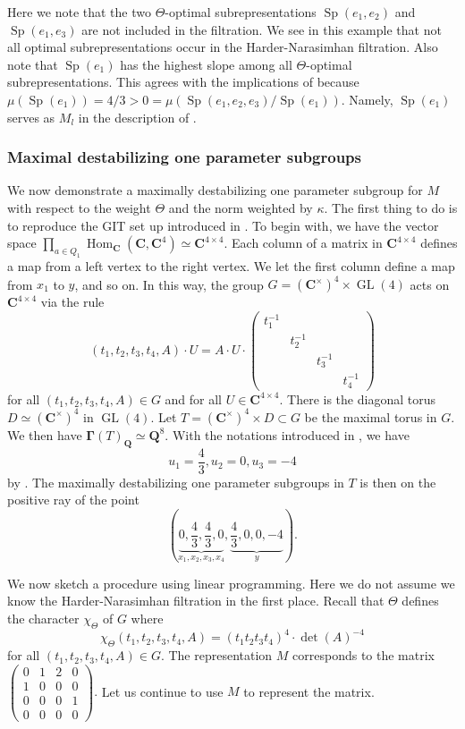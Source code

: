 \documentclass[a4paper]{amsart}
\numberwithin{equation}{section}
\theoremstyle{plain}
\theoremstyle{definition}
\DeclareMathOperator{\Hom}{Hom}
\DeclareMathOperator{\GL}{GL}
\DeclareMathOperator{\Sp}{Sp}
\begin{document}
Here we note that the two $\Theta$-optimal subrepresentations $\Sp(e_1,e_2)$ and $\Sp(e_1,e_3)$ are not included in the filtration.  We see in this example that not all optimal subrepresentations occur in the Harder-Narasimhan filtration. Also note that $\Sp(e_1)$ has the highest slope among all $\Theta$-optimal subrepresentations. This agrees with the implications of  because $\mu(\Sp(e_1))=4/3>0=\mu(\Sp(e_1,e_2,e_3)/\Sp(e_1))$. Namely, $\Sp(e_1)$ serves as $M_l$ in the description of  .

\subsubsection{Maximal destabilizing one parameter subgroups}
We now demonstrate a maximally destabilizing one parameter subgroup for $M$ with respect to the weight $\Theta$ and the norm weighted by $\kappa$. The first thing to do is to reproduce the GIT set up introduced in . To begin with, we have the vector space $\prod_{a\in Q_1}\Hom_\mathbf{C}(\mathbf{C},\mathbf{C}^4)\simeq \mathbf{C}^{4\times 4}$. Each column of a matrix in $\mathbf{C}^{4\times 4}$ defines a map from a left vertex to the right vertex. We let the first column define a map from $x_1$ to $y$, and so on. In this way, the group $G=(\mathbf{C}^{\times})^{4}\times \GL(4)$ acts on $\mathbf{C}^{4\times 4}$ via the rule
$$(t_1,t_2,t_3,t_4,A)\cdot U=A\cdot U\cdot \begin{pmatrix}
t_1^{-1}&&&\\
&t_2^{-1}&&\\
&&t_3^{-1}&\\
&&&t_4^{-1}
\end{pmatrix}$$ for all $(t_1,t_2,t_3,t_4,A)\in G$ and for all $U\in\mathbf{C}^{4\times 4}$. There is the diagonal torus $D\simeq (\mathbf{C}^{\times})^{4}$ in $\GL(4)$. Let $T=(\mathbf{C}^{\times})^{4}\times D\subset G$ be the maximal torus in $G$. We then have $\pmb{\Gamma}(T)_{\mathbf{Q}}\simeq\mathbf{Q}^{8}$. With the notations introduced in , we have $$u_1=\frac{4}{3},u_2= 0, u_3=-4$$ by . The maximally destabilizing one parameter subgroups in $T$ is then on the positive  ray of the point $$(\underbrace{0,\frac{4}{3},\frac{4}{3},0}_{x_1,x_2,x_3,x_4},\underbrace{\frac{4}{3},0,0,-4}_{y}).$$

We now sketch a procedure using linear programming. Here we do not assume we know the Harder-Narasimhan filtration in the first place. Recall that $\Theta$ defines the character $\chi_{\Theta}$ of $G$ where $$\chi_{\Theta}(t_1,t_2,t_3,t_4,A)=(t_1t_2t_3t_4)^4\cdot \det(A)^{-4} $$ for all $(t_1,t_2,t_3,t_4,A)\in G$. The representation $M$ corresponds to the matrix $\begin{pmatrix}
0&1&2&0\\
1&0&0&0\\
0&0&0&1\\
0&0&0&0
\end{pmatrix}.$ Let us continue to use $M$ to represent the matrix.
\end{document}
